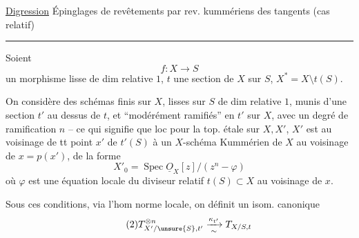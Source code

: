 \uline{Digression} Épinglages de revêtements par  rev. kummériens des  tangents (cas relatif)

\rule{\linewidth}{0.4pt}

Soient
\[
\tag{1}f:X\longrightarrow S
\]
un morphisme lisse de dim relative $1$, $t$ une section de $X$ sur $S$, $X^*=X\setminus t(S)$.

On considère des schémas  finis sur $X$, lisses sur $S$ de dim relative $1$, munis d'une section $t'$ au dessus de $t$, et ``modérément ramifiés'' en $t'$ sur $X$, avec un degré de ramification $n$ -- ce qui signifie que loc pour la top. étale sur $X,X'$, $X'$ est  au voisinage de tt point $x'$ de $t'(S)$ à un $X$-schéma Kummérien de $X$ au voisinage de $x=p(x')$, de la forme
\[
X'_0=\operatorname{Spec}\underline O_X[z]/(z^n-\varphi)
\]
où $\varphi$ est une équation locale du diviseur relatif $t(S)\subset X$ au voisinage de $x$.

Sous ces conditions, via l'hom norme locale, on définit un isom. canonique
\[
\tag{2}T_{X'/\unsure{S},t'}^{\otimes n}\xrightarrow[\sim]{\kappa_{t'}}T_{X/S,t}
\]
